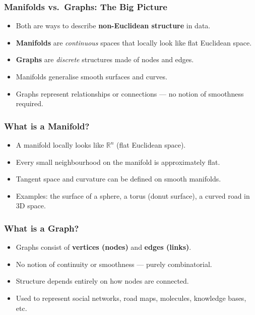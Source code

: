 \begin{frame}[fragile]\frametitle{Manifolds vs.\ Graphs: The Big Picture}
    \begin{itemize}
        \item Both are ways to describe \textbf{non-Euclidean structure} in data.
        \item \textbf{Manifolds} are \emph{continuous} spaces that locally look like flat Euclidean space.
        \item \textbf{Graphs} are \emph{discrete} structures made of nodes and edges.
        \item Manifolds generalise smooth surfaces and curves.
        \item Graphs represent relationships or connections --- no notion of smoothness required.
    \end{itemize}
\end{frame}

\begin{frame}[fragile]\frametitle{What is a Manifold?}
    \begin{itemize}
        \item A manifold locally looks like $\mathbb{R}^n$ (flat Euclidean space).
        \item Every small neighbourhood on the manifold is approximately flat.
        \item Tangent space and curvature can be defined on smooth manifolds.
        \item Examples: the surface of a sphere, a torus (donut surface), a curved road in 3D space.
    \end{itemize}
\end{frame}

\begin{frame}[fragile]\frametitle{What is a Graph?}
    \begin{itemize}
        \item Graphs consist of \textbf{vertices (nodes)} and \textbf{edges (links)}.
        \item No notion of continuity or smoothness --- purely combinatorial.
        \item Structure depends entirely on how nodes are connected.
        \item Used to represent social networks, road maps, molecules, knowledge bases, etc.
    \end{itemize}
\end{frame}

